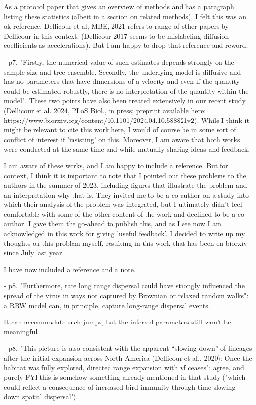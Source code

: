 \documentclass[11pt, oneside]{article}   	%
\newcommand{\response}[1]{{\color{black}{\bf Response:} #1}}
\begin{document}
\response{As a protocol paper that gives an overview of methods and has a paragraph listing these statistics (albeit in a section on related methods), I felt this was an ok reference. Dellicour et al, MBE, 2021 refers to range of other papers by Dellicour in this context. (Dellicour 2017 seems to be mislabeling diffusion coefficients as accelerations). But I am happy to drop that reference and reword. }


- p7, "Firstly, the numerical value of such estimates depends strongly on the sample size and tree ensemble. Secondly, the underlying model is diffusive and has no parameters that have dimensions of a velocity and even if the quantity could be estimated robustly, there is no interpretation of the quantity within the model". These two points have also been treated extensively in our recent study (Dellicour et al. 2024, PLoS Biol., in press; preprint available here: https://www.biorxiv.org/content/10.1101/2024.04.10.588821v2). While I think it might be relevant to cite this work here, I would of course be in some sort of conflict of interest if 'insisting' on this. Moreover, I am aware that both works were conducted at the same time and while mutually sharing ideas and feedback.

\response{I am aware of these works, and I am happy to include a reference. But for context, I think it is important to note that I pointed out these problems to the authors in the summer of 2023, including figures that illustrate the problem and an interpretation why that is. They invited me to be a co-author on a study into which their analysis of the problem was integrated, but I ultimately didn't feel comfortable with some of the other content of the work and declined to be a co-author. I gave them the go-ahead to publish this, and as I see now I am acknowledged in this work for giving 'useful feedback'. I decided to write up my thoughts on this problem myself, resulting in this work that has been on biorxiv since July last year.

I have now included a reference and a note.}


- p8. "Furthermore, rare long range dispersal could have strongly influenced the spread of the virus in ways not captured by Brownian or relaxed random walks": a RRW model can, in principle, capture long-range dispersal events.

\response{It can accommodate such jumps, but the inferred parameters still won't be meaningful. }

- p8, "This picture is also consistent with the apparent “slowing down” of lineages after the initial expansion across North America (Dellicour et al., 2020): Once the habitat was fully explored, directed range expansion with vf ceases": agree, and purely FYI this is somehow something already mentioned in that study ("which could reflect a consequence of increased bird immunity through time slowing down spatial dispersal").
\end{document}
